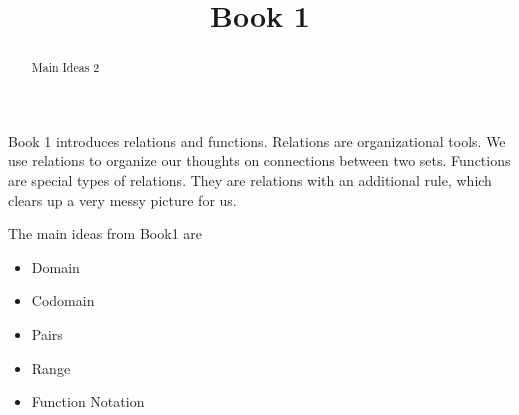 \documentclass{ximera}
\title{Book 1}
\begin{document}
\begin{abstract}
Main Ideas 2
\end{abstract}

\maketitle

\begin{sectionOutcomes}

Book 1 introduces relations and functions. Relations are organizational tools.  We use relations to organize our thoughts on connections between two sets. Functions are special types of relations.  They are relations with an additional rule, which clears up a very messy picture for us. 

The main ideas from Book1 are

\begin{itemize}
\item Domain 
\item Codomain
\item Pairs
\item Range
\item Function Notation
\end{itemize}

\end{sectionOutcomes}
\end{document}
